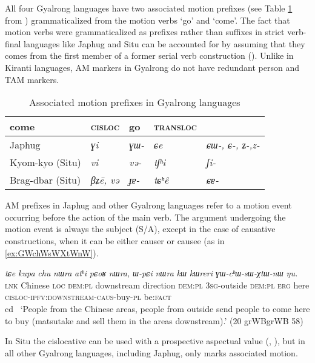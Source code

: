 \documentclass[oneside,a4paper,11pt]{article}
\newcommand{\ipa}[1]{{\phon\textit{#1}}}
\newcommand{\sens}[1]{‘#1’}
\begin{document}
All four Gyalrong languages have two associated motion prefixes (see Table \ref{tab:am-gyalrong} from \citealt[200]{zhang16bragdbar}) grammaticalized from the motion verbs `go' and `come'. The fact that motion verbs were grammaticalized as prefixes rather than suffixes in strict verb-final languages like Japhug and Situ can be accounted for by assuming that they comes from the first member of a former serial verb construction (\citealt{jacques13harmonization}). Unlike in Kiranti languages, AM markers in Gyalrong do not have redundant person and TAM markers.

\begin{table}[H]
\caption{Associated motion prefixes in Gyalrong languages} \centering \label{tab:am-gyalrong}
\begin{tabular}{lllll}
\toprule
come & \textsc{cisloc} & go & \textsc{transloc} \\
\midrule
Japhug &  \ipa{ɣi} &\ipa{ɣɯ-} &\ipa{ɕe} &\ipa{ɕɯ-, ɕ-, ʑ-,z- } \\
Kyom-kyo (Situ) &\ipa{vi} &\ipa{və-} &\ipa{tʃʰi} &\ipa{ʃi-} \\
Brag-dbar (Situ) &\ipa{βʑē, və} &\ipa{ɟɐ-} &\ipa{tɕʰê} &\ipa{ɕɐ-} \\
\bottomrule
\end{tabular}
\end{table}

AM prefixes in Japhug and other Gyalrong languages refer to a motion event occurring before the action of the main verb. The argument undergoing the motion event is always the subject (S/A), except in the case of causative constructions, when it can be either causer or causee (as in \ref{ex:GWchWsWXtWnW}).

\begin{exe}
\ex \label{ex:GWchWsWXtWnW}
\gll
\ipa{tɕe} 	\ipa{kupa} 	\ipa{chu} 	\ipa{nɯra} 	\ipa{atʰi} 	\ipa{pɕoʁ} 	\ipa{nɯra,} 	\ipa{ɯ-pɕi} 	\ipa{nɯra} 	\ipa{kɯ} 	\ipa{kɯreri} 	\ipa{ɣɯ-cʰɯ-sɯ-χtɯ-nɯ} 	\ipa{ŋu.}  \\
\textsc{lnk} Chinese \textsc{loc} \textsc{dem:pl} downstream direction \textsc{dem:pl} \textsc{3sg}-outside  \textsc{dem:pl}  \textsc{erg} here \textsc{cisloc-ipfv:downstream-caus}-buy-\textsc{pl} be:\textsc{fact} \\cd \
\glt \sens{People from the Chinese areas, people from outside send people to come here to buy (matsutake and sell them in the areas downstream).} (20 grWBgrWB 58)
  \end{exe} 

In Situ the cislocative can be used with a prospective aspectual  value (\citealt{linyj03tense}, \citealt[204]{zhang16bragdbar}), but in all other Gyalrong languages, including Japhug, only marks associated motion.
\end{document}
